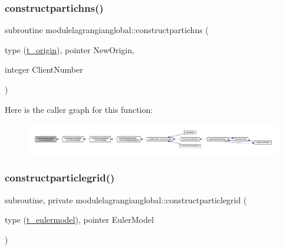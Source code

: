 \subsubsection{\texorpdfstring{constructpartichns()}{constructpartichns()}}
{\footnotesize\ttfamily subroutine modulelagrangianglobal\+::constructpartichns (\begin{DoxyParamCaption}\item[{type (\mbox{\hyperlink{structmodulelagrangianglobal_1_1t__origin}{t\+\_\+origin}}), pointer}]{New\+Origin,  }\item[{integer}]{Client\+Number }\end{DoxyParamCaption})\hspace{0.3cm}{\ttfamily [private]}}

Here is the caller graph for this function\+:\nopagebreak
\begin{figure}[H]
\begin{center}
\leavevmode
\includegraphics[width=350pt]{namespacemodulelagrangianglobal_ab6e9439dc837db2093ed5e4108e57726_icgraph}
\end{center}
\end{figure}
\mbox{\label{namespacemodulelagrangianglobal_aad6524644ca62cde451d62e0964fe5de}} 
\subsubsection{\texorpdfstring{constructparticlegrid()}{constructparticlegrid()}}
{\footnotesize\ttfamily subroutine, private modulelagrangianglobal\+::constructparticlegrid (\begin{DoxyParamCaption}\item[{type (\mbox{\hyperlink{structmodulelagrangianglobal_1_1t__eulermodel}{t\+\_\+eulermodel}}), pointer}]{Euler\+Model }\end{DoxyParamCaption})\hspace{0.3cm}{\ttfamily [private]}}

